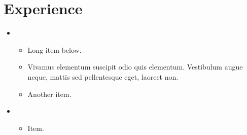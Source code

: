 \section{Experience}

\begin{itemize}
	\item {

		\begin{itemize}
			\item Long item below.
			\item Vivamus elementum suscipit odio quis elementum. Vestibulum augue neque, mattis sed pellentesque eget, laoreet non.
			\item Another item.
		\end{itemize}
	}
	\item {
		
		\begin{itemize}
			\item Item.
		\end{itemize}
	}
\end{itemize}

